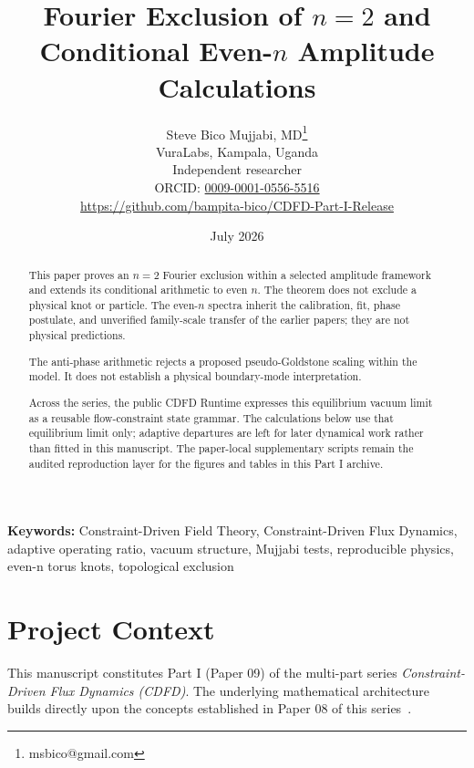 \documentclass[11pt]{article}
\begin{document}
\title{Fourier Exclusion of $n=2$ and Conditional Even-$n$ Amplitude Calculations}

\author{Steve Bico Mujjabi, MD\thanks{msbico@gmail.com}\\
VuraLabs, Kampala, Uganda\\
Independent researcher\\
ORCID: \href{https://orcid.org/0009-0001-0556-5516}{0009-0001-0556-5516}\\
\url{https://github.com/bampita-bico/CDFD-Part-I-Release}}

\date{July 2026}

\maketitle

\begin{abstract}
This paper proves an $n=2$ Fourier exclusion within a selected amplitude
framework and extends its conditional arithmetic to even $n$. The theorem does
not exclude a physical knot or particle. The even-$n$ spectra inherit the
calibration, fit, phase postulate, and unverified family-scale transfer of the
earlier papers; they are not physical predictions.

The anti-phase arithmetic rejects a proposed pseudo-Goldstone scaling within
the model. It does not establish a physical boundary-mode interpretation.

Across the series, the public CDFD Runtime expresses this equilibrium vacuum
limit as a reusable flow-constraint state grammar. The calculations below use
that equilibrium limit only; adaptive departures are left for later dynamical
work rather than fitted in this manuscript. The paper-local supplementary
scripts remain the audited reproduction layer for the figures and tables in
this Part I archive.
\end{abstract}

\noindent\textbf{Keywords:} Constraint-Driven Field Theory, Constraint-Driven Flux Dynamics, adaptive operating ratio, vacuum structure, Mujjabi tests, reproducible physics, even-n torus knots, topological exclusion

\vspace{0.75em}
\linenumbers

\section*{Project Context}
This manuscript constitutes Part I (Paper 09) of the multi-part series
\textit{Constraint-Driven Flux Dynamics (CDFD)}. The underlying mathematical
architecture builds directly upon the concepts established in Paper 08 of this
series~\cite{MujjabiVIII2026}.
\end{document}
